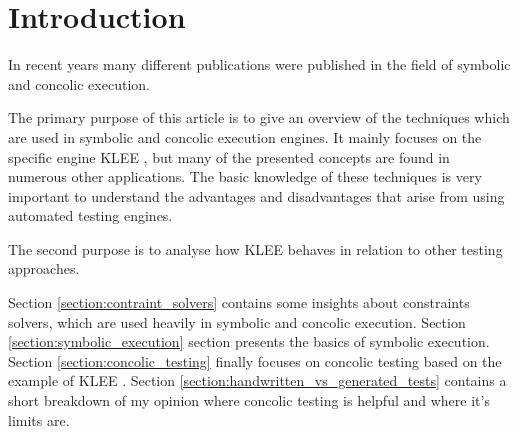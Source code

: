 \section{Introduction}
In recent years many different publications were published in the field of symbolic and concolic execution. 

The primary purpose of this article is to give an overview of the techniques which are used in symbolic and concolic execution engines.
It mainly focuses on the specific engine KLEE \cite{Cadar:2008:KUA:1855741.1855756}, but many of the presented concepts are found in numerous other applications.
The basic knowledge of these techniques is very important to understand the advantages and disadvantages that arise from using automated testing engines.

The second purpose is to analyse how KLEE behaves in relation to other testing approaches.

Section \ref{section:contraint_solvers} contains some insights about constraints solvers, which are used heavily in symbolic and concolic execution.
Section \ref{section:symbolic_execution} section presents the basics of symbolic execution.
Section \ref{section:concolic_testing} finally focuses on concolic testing based on the example of KLEE \cite{Cadar:2008:KUA:1855741.1855756}. 
Section \ref{section:handwritten_vs_generated_tests} contains a short breakdown of my opinion where concolic testing is helpful and where it's limits are.